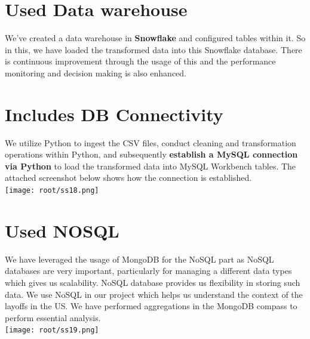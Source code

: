 \section{\Large\textbf{Used Data warehouse }}
{We've created a data warehouse in \textbf{Snowflake} and configured tables within it. So in this, we have loaded the transformed data into this Snowflake database. There is continuous improvement through the usage of this and the performance monitoring and decision making is also enhanced.}\\

\section{\Large\textbf{Includes DB Connectivity}}
{We utilize Python to ingest the CSV files, conduct cleaning and transformation operations within Python, and subsequently \textbf{establish a MySQL connection via Python} to load the transformed data into MySQL Workbench tables. 
The attached screenshot below shows how the connection is established.}\\
\texttt{[image: root/ss18.png]}~\\


\section{\Large\textbf{Used NOSQL}}
{We have leveraged the usage of MongoDB for the NoSQL part as NoSQL databases are very important, particularly for managing a different data types which gives us scalability. NoSQL database provides us flexibility in storing such data. We use NoSQL in our project which helps us understand the context of the layoffs in the US. We have performed aggregations in the MongoDB compass to perform essential analysis.}\\[1cm]
\texttt{[image: root/ss19.png]}~\\